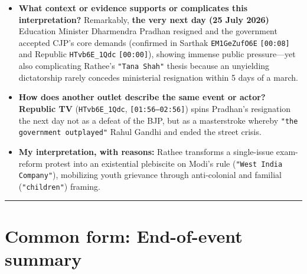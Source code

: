 \documentclass[10pt,a4paper]{article}
\begin{document}
\begin{itemize}[leftmargin=1.5em, itemsep=3pt, topsep=4pt]
  \item \textbf{What context or evidence supports or complicates this interpretation?} Remarkably, \textbf{the very next day (25 July 2026)} Education Minister Dharmendra Pradhan resigned and the government accepted CJP's core demands (confirmed in Sarthak \texttt{EM1GeZufO6E} \texttt{[00:08]} and Republic \texttt{HTvb6E\_1Qdc} \texttt{[00:00]}), showing immense public pressure---yet also complicating Rathee's \texttt{"Tana Shah"} thesis because an unyielding dictatorship rarely concedes ministerial resignation within 5 days of a march.
  \item \textbf{How does another outlet describe the same event or actor?} \textbf{Republic TV} (\texttt{HTvb6E\_1Qdc}, \texttt{[01:56--02:56]}) spins Pradhan's resignation the next day not as a defeat of the BJP, but as a masterstroke whereby \texttt{"the government outplayed"} Rahul Gandhi and ended the street crisis.
  \item \textbf{My interpretation, with reasons:} Rathee transforms a single-issue exam-reform protest into an existential plebiscite on Modi's rule (\texttt{"West India Company"}), mobilizing youth grievance through anti-colonial and familial (\texttt{"children"}) framing.
\end{itemize}
\vspace{4pt}\noindent\rule{\textwidth}{0.4pt}\vspace{4pt}

\section*{Common form: End-of-event summary}
\end{document}
